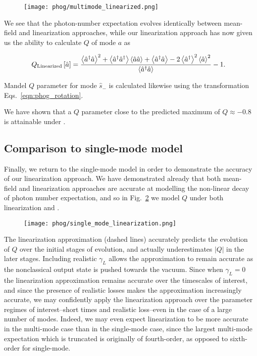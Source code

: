 \begin{figure}[htp]
\centering
\texttt{[image: phog/multimode\_linearized.png]}
\caption{\label{fig:phog_multimode_linearized} }
\end{figure}

We see that the photon-number expectation evolves identically between mean-field and linearization approaches, while our linearization approach has now given us the ability to calculate $Q$ of mode $a$ as

\begin{equation}
Q_{\text{Linearized}}\left[\hat{a}\right] = \frac{\ev{\hat{a}^\dagger \hat{a}}^2 + \ev{\hat{a}^\dagger\hat{a}^\dagger} \ev{\hat{a}\hat{a}} + \ev{\hat{a}^\dagger \hat{a}} - 2 \ev{\hat{a}^\dagger}^2 \ev{\hat{a}}^2}{\ev{\hat{a}^\dagger \hat{a}}} - 1.
\end{equation}

\noindent Mandel $Q$ parameter for mode $\hat{s}_-$ is calculated likewise using the transformation Eqs.~\ref{eqn:phog_rotation}. 

We have shown that a $Q$ parameter close to the predicted maximum of $Q \approx -0.8$ is attainable under .

\subsection{Comparison to single-mode model}
Finally, we return to the single-mode model in order to demonstrate the accuracy of our linearization approach. We have demonstrated already that both mean-field and linearization approaches are accurate at modelling the non-linear decay of photon number expectation, and so in Fig.~\ref{fig:phog_single_mode_linearization} we model $Q$ under both linearization and .

\begin{figure}[htp]
\centering
\texttt{[image: phog/single\_mode\_linearization.png]}
\caption{\label{fig:phog_single_mode_linearization} }
\end{figure}

The linearization approximation (dashed lines) accurately predicts the evolution of $Q$ over the initial stages of evolution, and actually underestimates $\left|Q\right|$ in the later stages. Including realistic $\gamma_L$ allows the approximation to remain accurate as the nonclassical output state is pushed towards the vacuum. Since when $\gamma_L = 0$ the linearization approximation remains accurate over the timescales of interest, and since the presence of realistic losses makes the approximation increasingly accurate, we may confidently apply the linearization approach over the parameter regimes of interest--short times and realistic loss--even in the case of a large number of modes. Indeed, we may even expect linearization to be more accurate in the multi-mode case than in the single-mode case, since the largest multi-mode expectation which is truncated is originally of fourth-order, as opposed to sixth-order for single-mode.



